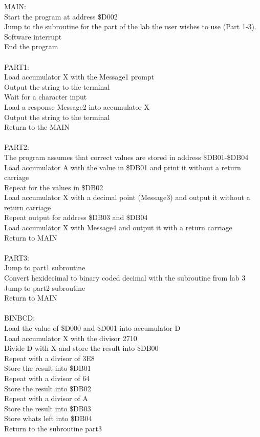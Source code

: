 \documentclass[12pt]{report}
\begin{document}
	MAIN:\\
	Start the program at address \$D002\\
	Jump to the subroutine for the part of the lab the user wishes to use (Part 1-3).\\
	Software interrupt\\
	End the program\\\\

	PART1:\\
	Load accumulator X with the Message1 prompt\\
	Output the string to the terminal\\
	Wait for a character input\\
	Load a response Message2 into accumulator X\\
	Output the string to the terminal\\
	Return to the MAIN\\\\

	PART2:\\
	The program assumes that correct values are stored in address \$DB01-\$DB04\\
	Load accumulator A with the value in \$DB01 and print it without a return carriage\\
	Repeat for the values in \$DB02\\
	Load accumulator X with a decimal point (Message3) and output it without a return carriage\\
	Repeat output for address \$DB03 and \$DB04\\
	Load accumulator X with Message4 and output it with a return carriage\\
	Return to MAIN\\\\

	PART3:\\
	Jump to part1 subroutine\\
	Convert hexidecimal to binary coded decimal with the subroutine from lab 3\\
	Jump to part2 subroutine\\
	Return to MAIN\\\\

	BINBCD:\\
	Load the value of \$D000 and \$D001 into accumulator D\\
	Load accumulator X with the divisor 2710\\
	Divide D with X and store the result into \$DB00\\
	Repeat with a divisor of 3E8\\
	Store the result into \$DB01\\
	Repeat with a divisor of 64\\
	Store the result into \$DB02\\
	Repeat with a divisor of A\\
	Store the result into \$DB03\\
	Store whats left into \$DB04\\
	Return to the subroutine part3\\
\end{document}
